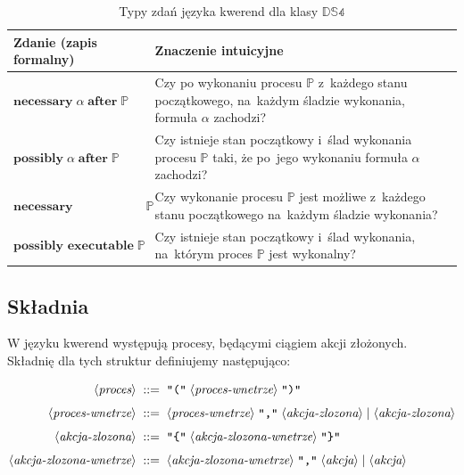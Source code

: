 \documentclass[11pt,a4paper]{article}
\newcommand{\bnfchar}[1]{\texttt{\textquotedbl#1\textquotedbl}}
\newcommand{\bnfsym}[1]{\langle \textit{#1} \rangle}
\theoremstyle{definition}
\begin{document}
\begin{table}[ht]
\centering
\caption{Typy zdań języka kwerend dla klasy $\mathbb{DS4}$}
\label{tab:ds4-query-language}
\renewcommand{\arraystretch}{1.2}
\begin{tabular}{|p{}|p{}|}
\hline
\textbf{Zdanie (zapis formalny)} & \textbf{Znaczenie intuicyjne} \\ \hline

$\textbf{necessary}\; \alpha \;\textbf{after}\; \mathbb{P}$ &
Czy po wykonaniu procesu $\mathbb{P}$ z~każdego stanu początkowego, na~każdym śladzie wykonania, formuła $\alpha$ zachodzi? \\ \hline

$\textbf{possibly}\; \alpha \;\textbf{after}\; \mathbb{P}$ &
Czy istnieje stan początkowy i~ślad wykonania procesu $\mathbb{P}$ taki, że po~jego wykonaniu formuła $\alpha$ zachodzi? \\ \hline

$\textbf{necessary executable}\; \mathbb{P}$ &
Czy wykonanie procesu $\mathbb{P}$ jest możliwe z~każdego stanu początkowego na~każdym śladzie wykonania? \\ \hline

$\textbf{possibly executable}\; \mathbb{P}$ &
Czy istnieje stan początkowy i~ślad wykonania, na~którym proces $\mathbb{P}$ jest wykonalny? \\ \hline

\end{tabular}
\end{table}

\subsection{Składnia}

W języku kwerend występują procesy, będącymi ciągiem akcji złożonych. Składnię dla tych struktur definiujemy następująco:

\begin{align*}
    \bnfsym{proces} \;::=\;&  \; 
    \bnfchar{(} \; \bnfsym{proces-wnetrze} \; \bnfchar{)} \; \\[4pt]
    \bnfsym{proces-wnetrze} \;::=\;&  \; 
    \bnfsym{proces-wnetrze} \; \bnfchar{,} \; \bnfsym{akcja-zlozona} \; | \; \bnfsym{akcja-zlozona} \\[4pt]
    \bnfsym{akcja-zlozona} \;::=\;&  \; 
    \bnfchar{\{} \; \bnfsym{akcja-zlozona-wnetrze} \; \bnfchar{\}} \; \\[4pt]
    \bnfsym{akcja-zlozona-wnetrze} \;::=\;&  \; 
    \bnfsym{akcja-zlozona-wnetrze} \; \bnfchar{,} \; \bnfsym{akcja} \; | \; \bnfsym{akcja} \\[4pt]
\end{align*}
\end{document}

